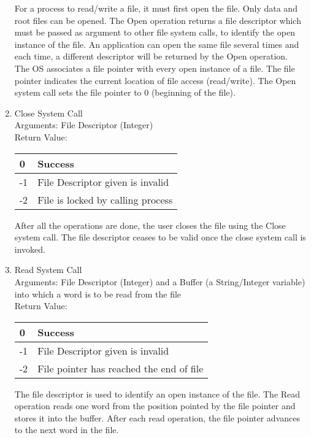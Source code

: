 \begin{enumerate}
For a process to read/write a file, it must first open the file. Only data and root files can be opened. The Open operation returns a file descriptor which must be passed as argument to other file system calls, to identify the open instance of the file. An application can open the same file several times and each time, a different descriptor will be returned by the Open operation. 
\\
The OS associates a file pointer with every open instance of a file. The file pointer indicates the current location of file access (read/write). The Open system call sets the file pointer to 0 (beginning of the file).


\item{Close System Call}\\
Arguments: File Descriptor (Integer)\\
Return Value:
\FloatBarrier \begin{table}[H]
\centering
\begin{tabular}{|l|l|}
\hline
0  & Success           \\ \hline
-1 & File Descriptor given is invalid  \\ \hline
-2 & File is locked by calling process \\ \hline
\end{tabular}
\end{table} \FloatBarrier 

 After all the operations are done, the user closes the file using the Close system call. The file descriptor ceases to be valid once the close system call is invoked. 


\item{Read System Call}\\
Arguments: File Descriptor (Integer) and a Buffer (a String/Integer variable) into which a word is to be read from the file\\
Return Value:
\FloatBarrier \begin{table}[H]
\centering
\begin{tabular}{|l|l|}
\hline
0  & Success           \\ \hline
-1 & File Descriptor given is invalid  \\ \hline
-2 & File pointer has reached the end of file \\ \hline
\end{tabular}
\end{table} \FloatBarrier 

The file descriptor is used to identify an open instance of the file. The Read operation reads one word from the position pointed by the file pointer and stores it into the buffer. After each read operation, the file pointer advances to the next word in the file. 


\end{enumerate}
